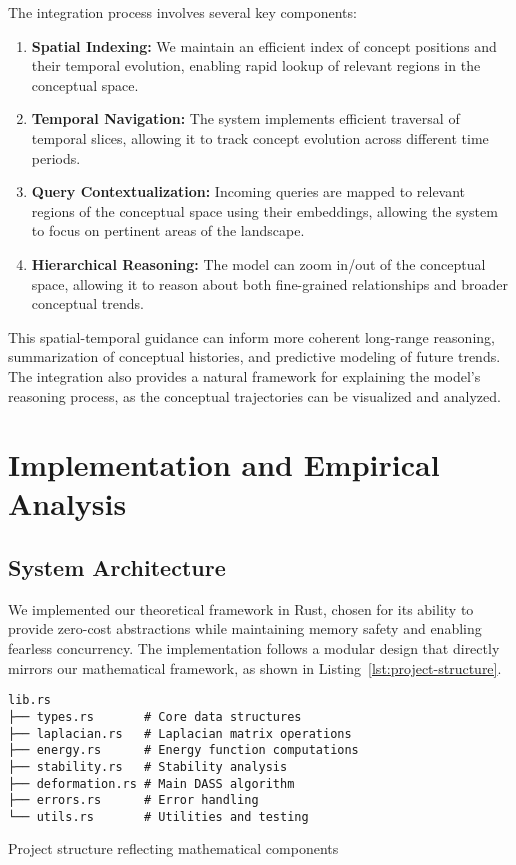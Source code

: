 \documentclass{article}
\begin{document}
The integration process involves several key components:

\begin{enumerate}
    \item \textbf{Spatial Indexing:} We maintain an efficient index of concept positions and their temporal evolution, enabling rapid lookup of relevant regions in the conceptual space.
    
    \item \textbf{Temporal Navigation:} The system implements efficient traversal of temporal slices, allowing it to track concept evolution across different time periods.
    
    \item \textbf{Query Contextualization:} Incoming queries are mapped to relevant regions of the conceptual space using their embeddings, allowing the system to focus on pertinent areas of the landscape.
    
    \item \textbf{Hierarchical Reasoning:} The model can zoom in/out of the conceptual space, allowing it to reason about both fine-grained relationships and broader conceptual trends.
\end{enumerate}

This spatial-temporal guidance can inform more coherent long-range reasoning, summarization of conceptual histories, and predictive modeling of future trends. The integration also provides a natural framework for explaining the model's reasoning process, as the conceptual trajectories can be visualized and analyzed.

\section{Implementation and Empirical Analysis}

\subsection{System Architecture}
We implemented our theoretical framework in Rust, chosen for its ability to provide zero-cost abstractions while maintaining memory safety and enabling fearless concurrency. The implementation follows a modular design that directly mirrors our mathematical framework, as shown in Listing~\ref{lst:project-structure}.

\begin{listing}[h]
\begin{verbatim}
lib.rs
├── types.rs       # Core data structures
├── laplacian.rs   # Laplacian matrix operations
├── energy.rs      # Energy function computations
├── stability.rs   # Stability analysis
├── deformation.rs # Main DASS algorithm
├── errors.rs      # Error handling
└── utils.rs       # Utilities and testing
\end{verbatim}
\caption{Project structure reflecting mathematical components}
\label{lst:project-structure}
\end{listing}
\end{document}
